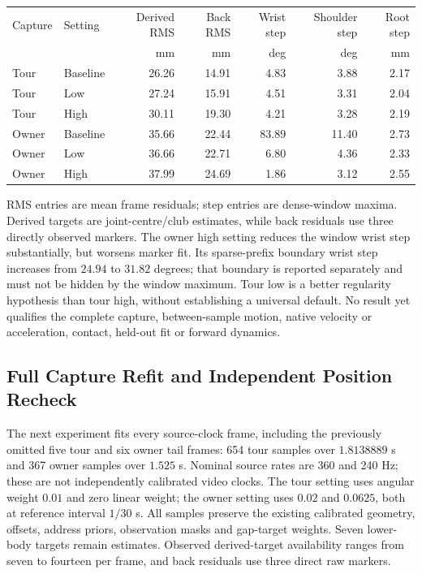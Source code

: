 \documentclass[11pt,a4paper]{article}
\begin{document}
\begin{center}
\begin{tabular}{llrrrrr}
\hline
Capture & Setting & Derived RMS & Back RMS & Wrist step & Shoulder step & Root step\\
 & & mm & mm & deg & deg & mm\\
\hline
Tour & Baseline & 26.26 & 14.91 & 4.83 & 3.88 & 2.17\\
Tour & Low & 27.24 & 15.91 & 4.51 & 3.31 & 2.04\\
Tour & High & 30.11 & 19.30 & 4.21 & 3.28 & 2.19\\
Owner & Baseline & 35.66 & 22.44 & 83.89 & 11.40 & 2.73\\
Owner & Low & 36.66 & 22.71 & 6.80 & 4.36 & 2.33\\
Owner & High & 37.99 & 24.69 & 1.86 & 3.12 & 2.55\\
\hline
\end{tabular}
\end{center}
RMS entries are mean frame residuals; step entries are dense-window maxima.
Derived targets are joint-centre/club estimates, while back residuals use
three directly observed markers. The owner high setting reduces the window
wrist step substantially, but worsens marker fit. Its sparse-prefix boundary
wrist step increases from $24.94$ to $31.82$ degrees; that boundary is reported
separately and must not be hidden by the window maximum. Tour low is a better
regularity hypothesis than tour high, without establishing a universal default.
No result yet qualifies the complete capture, between-sample motion, native
velocity or acceleration, contact, held-out fit or forward dynamics.

\subsection{Full Capture Refit and Independent Position Recheck}
The next experiment fits every source-clock frame, including the previously
omitted five tour and six owner tail frames: 654 tour samples over
$1.8138889$ s and 367 owner samples over $1.525$ s. Nominal source rates
are 360 and 240 Hz; these are not independently calibrated video clocks.
The tour setting uses angular weight $0.01$ and zero linear weight; the
owner setting uses $0.02$ and $0.0625$, both at reference interval $1/30$ s.
All samples preserve the existing calibrated geometry, offsets, address
priors, observation masks and gap-target weights. Seven lower-body targets
remain estimates. Observed derived-target availability ranges from seven to
fourteen per frame, and back residuals use three direct raw markers.
\end{document}

